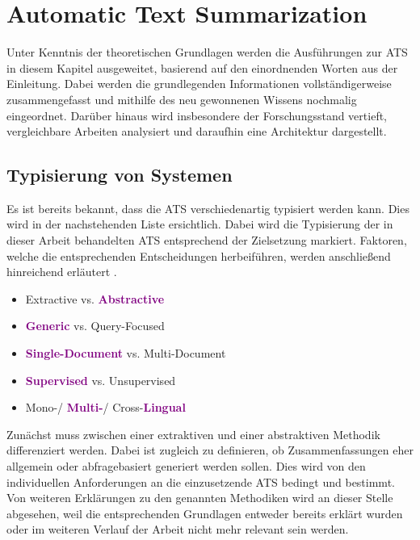 \chapter{Automatic Text Summarization}
\thispagestyle{fancy}
\label{chap:Automatic Text Summarization}

\noindent
Unter Kenntnis der theoretischen Grundlagen werden die Ausführungen zur \ac{ATS} in diesem Kapitel ausgeweitet, basierend auf den einordnenden Worten aus der Einleitung. Dabei werden die grundlegenden Informationen vollständigerweise zusammengefasst und mithilfe des neu gewonnenen Wissens nochmalig eingeordnet. Darüber hinaus wird insbesondere der Forschungsstand vertieft, vergleichbare Arbeiten analysiert und daraufhin eine Architektur dargestellt.


\section{Typisierung von Systemen}
\noindent
Es ist bereits bekannt, dass die \ac{ATS} verschiedenartig typisiert werden kann. Dies wird in der nachstehenden Liste ersichtlich. Dabei wird die Typisierung der in dieser Arbeit behandelten \ac{ATS} entsprechend der Zielsetzung markiert. Faktoren, welche die entsprechenden Entscheidungen herbeiführen, werden anschließend hinreichend erläutert \cite[S.~5]{GAM16}.

\begin{itemize}
	\item Extractive vs. \textbf{\textcolor{purple}{Abstractive}}
	\item \textbf{\textcolor{purple}{Generic}} vs. Query-Focused
	\item \textbf{\textcolor{purple}{Single-Document}} vs. Multi-Document
	\item \textbf{\textcolor{purple}{Supervised}} vs. Unsupervised
	\item Mono-/ \textbf{\textcolor{purple}{Multi-}}/ Cross-\textbf{\textcolor{purple}{Lingual}}
\end{itemize}

\noindent
Zunächst muss zwischen einer extraktiven und einer abstraktiven Methodik differenziert werden. Dabei ist zugleich zu definieren, ob Zusammenfassungen eher allgemein oder abfragebasiert generiert werden sollen. Dies wird von den individuellen Anforderungen an die einzusetzende \ac{ATS} bedingt und bestimmt. Von weiteren Erklärungen zu den genannten Methodiken wird an dieser Stelle abgesehen, weil die entsprechenden Grundlagen entweder bereits erklärt wurden oder im weiteren Verlauf der Arbeit nicht mehr relevant sein werden.
\newpage

